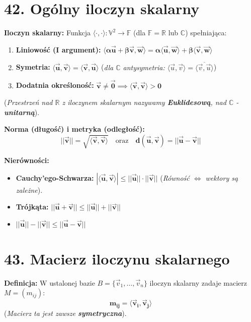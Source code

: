 \documentclass[12pt,a4paper]{article}
\begin{document}
\section*{42. Ogólny iloczyn skalarny}
\noindent\textbf{Iloczyn skalarny:} Funkcja $\langle \cdot, \cdot \rangle: \mathbb{V}^2 \to \mathbb{F}$ (dla $\mathbb{F} = \mathbb{R}$ lub $\mathbb{C}$) spełniająca:
\begin{enumerate}
    \item \textbf{Liniowość (I argument):} $\mathbf{\langle \alpha \vec{u} + \beta \vec{v}, \vec{w} \rangle = \alpha \langle \vec{u}, \vec{w} \rangle + \beta \langle \vec{v}, \vec{w} \rangle}$
    \item \textbf{Symetria:} $\mathbf{\langle \vec{u}, \vec{v} \rangle = \langle \vec{v}, \vec{u} \rangle}$ (\textit{dla $\mathbb{C}$ antysymetria: $\langle \vec{u}, \vec{v} \rangle = \overline{\langle \vec{v}, \vec{u} \rangle}$})
    \item \textbf{Dodatnia określoność:} $\mathbf{\vec{v} \neq \vec{0} \implies \langle \vec{v}, \vec{v} \rangle > 0}$
\end{enumerate}
(\textit{Przestrzeń nad $\mathbb{R}$ z iloczynem skalarnym nazywamy \textbf{Euklidesową}, nad $\mathbb{C}$ - \textbf{unitarną}}).

\noindent\textbf{Norma (długość) i metryka (odległość):}
$$ \mathbf{||\vec{v}|| = \sqrt{\langle \vec{v}, \vec{v} \rangle}} \quad \text{oraz} \quad \mathbf{d(\vec{u}, \vec{v}) = ||\vec{u} - \vec{v}||} $$

\noindent\textbf{Nierówności:}
\begin{itemize}
    \item \textbf{Cauchy'ego-Schwarza:} $\mathbf{|\langle \vec{u}, \vec{v} \rangle| \le ||\vec{u}|| \cdot ||\vec{v}||}$ (\textit{Równość $\iff$ wektory są zależne}).
    \item \textbf{Trójkąta:} $\mathbf{||\vec{u} + \vec{v}|| \le ||\vec{u}|| + ||\vec{v}||}$
    \item $\mathbf{||\vec{u}|| - ||\vec{v}|| \le ||\vec{u} - \vec{v}||}$
\end{itemize}

\section*{43. Macierz iloczynu skalarnego}
\noindent\textbf{Definicja:} W ustalonej bazie $B = \{\vec{v}_1, \dots, \vec{v}_n\}$ iloczyn skalarny zadaje macierz $M = (m_{ij})$:
$$ \mathbf{m_{ij} = \langle \vec{v}_i, \vec{v}_j \rangle} $$
(\textit{Macierz ta jest zawsze \textbf{symetryczna}}).
\end{document}
